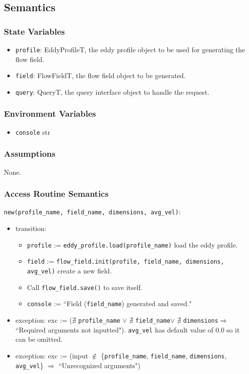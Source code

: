 \documentclass[12pt, titlepage]{article}
\begin{document}
\subsection{Semantics}

\subsubsection{State Variables}
\begin{itemize}
  \item \texttt{profile}: EddyProfileT, the eddy profile object to be used for generating the flow field.
  \item \texttt{field}: FlowFieldT, the flow field object to be generated.
  \item \texttt{query}: QueryT, the query interface object to handle the request.
\end{itemize}

\subsubsection{Environment Variables}
\begin{itemize}
  \item \texttt{console} str
\end{itemize}

\subsubsection{Assumptions}
None.

\subsubsection{Access Routine Semantics}

\noindent \texttt{new(profile\_name, field\_name, dimensions, avg\_vel)}:
\begin{itemize}
  \item transition:
  \begin{itemize}
    \item \texttt{profile} := \texttt{eddy\_profile.load(profile\_name)} load the eddy profile.
    \item \texttt{field} := \texttt{flow\_field.init(profile, field\_name, dimensions, avg\_vel)} create a new field.
    \item Call \texttt{flow\_field.save()} to save itself.
    \item \texttt{console} := ``Field (\texttt{field\_name}) generated and saved."
  \end{itemize}
  \item exception: exc := ($\nexists$ \texttt{profile\_name} $\vee$ $\nexists$ \texttt{field\_name}$\vee$ $\nexists$ \texttt{dimensions}$\Rightarrow$ ``Required arguments not inputted"). \texttt{avg\_vel} has default value of 0.0 so it can be omitted.
  \item exception: exc := (input $\notin$ \{\texttt{profile\_name}, \texttt{field\_name}, \texttt{dimensions}, \texttt{avg\_vel}\} $\Rightarrow$ ``Unrecognized arguments")
\end{itemize}
\end{document}
